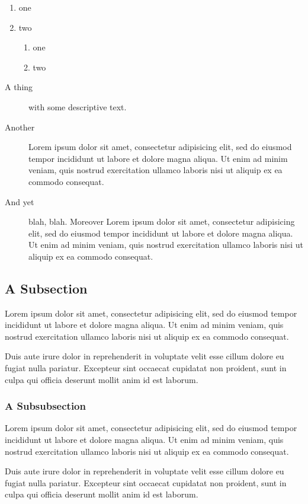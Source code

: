 \documentclass{article}
\begin{document}
\begin{enumerate}
 \item one
 \item two
   \begin{enumerate}
    \item one
    \item two
   \end{enumerate}
\end{enumerate}

\begin{description}
\item[A thing] with some descriptive text.
\item[Another] Lorem ipsum dolor sit amet, consectetur adipisicing elit, sed do eiusmod tempor incididunt ut labore et dolore magna aliqua. Ut enim ad minim veniam, quis nostrud exercitation ullamco laboris nisi ut aliquip ex ea commodo consequat.
\item[And yet] blah, blah. Moreover
Lorem ipsum dolor sit amet, consectetur adipisicing elit, sed do eiusmod tempor incididunt ut labore et dolore magna aliqua. Ut enim ad minim veniam, quis nostrud exercitation ullamco laboris nisi ut aliquip ex ea commodo consequat.
\end{description}

\subsection{A Subsection}
Lorem ipsum dolor sit amet, consectetur adipisicing elit, sed do eiusmod tempor incididunt ut labore et dolore magna aliqua. Ut enim ad minim veniam, quis nostrud exercitation ullamco laboris nisi ut aliquip ex ea commodo consequat.

Duis aute irure dolor in reprehenderit in voluptate velit esse cillum dolore eu fugiat nulla pariatur. Excepteur sint occaecat cupidatat non proident, sunt in culpa qui officia deserunt mollit anim id est laborum.

\subsubsection{A Subsubsection}
Lorem ipsum dolor sit amet, consectetur adipisicing elit, sed do eiusmod tempor incididunt ut labore et dolore magna aliqua. Ut enim ad minim veniam, quis nostrud exercitation ullamco laboris nisi ut aliquip ex ea commodo consequat.

Duis aute irure dolor in reprehenderit in voluptate velit esse cillum dolore eu fugiat nulla pariatur. Excepteur sint occaecat cupidatat non proident, sunt in culpa qui officia deserunt mollit anim id est laborum.
\end{document}
